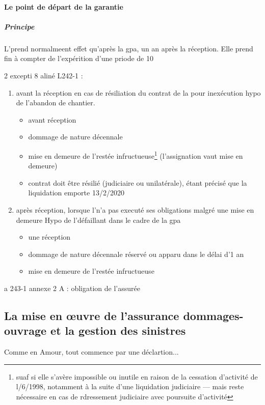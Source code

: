 			\paragraph{Le point de départ de la garantie}

				\subparagraph{Principe} L'\ado prend normalmeent effet qu'après la gpa, \cad un an après la réception. Elle prend fin à compter de l'expérition d'une priode de 10

				2 excepti 8 aliné L242-1 \ca :
				\begin{enumerate}
					\item avant la réception en cas de résiliation du contrat de la pour inexécution hypo de l'abandon de chantier.
					\begin{itemize}
						\item avant réception
						\item dommage de nature décennale
						\item mise en demeure de l'\E restée infructueuse\footnote{suaf si elle s'avère impossible ou inutile en raison de la cessation d'activité de l/6/1998, notamment à la suite d'une liquidation judiciaire --- mais reste nécessaire en cas de rdressement judiciaire avec poursuite d'activité} (l'assignation vaut mise en demeure)
						\item contrat doit être résilié (judiciaire ou unilatérale), étant précisé que la liquidation emporte 13/2/2020
					\end{itemize}
					\item après réception, lorsque l'\E n'a pas executé ses obligations malgré une mise en demeure Hypo de l'\E défaillant dans le cadre de la gpa
					\begin{itemize}
						\item une réception
						\item dommage de nature décennale réservé ou apparu dans le délai d'1 an
						\item mise en demeure de l'\E restée infructueuse
					\end{itemize}
				\end{enumerate}

a 243-1 annexe 2 A : obligation de l'assurée

	\subsection{La mise en œuvre de l'assurance dommages-ouvrage et la gestion des sinistres}

		Comme en Amour, tout commence par une déclartion...

